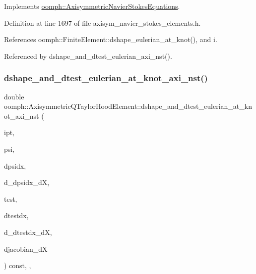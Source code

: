 Implements \hyperlink{classoomph_1_1AxisymmetricNavierStokesEquations_a76e090fdac4507d10eb9f81feb53a51b}{oomph\+::\+Axisymmetric\+Navier\+Stokes\+Equations}.



Definition at line 1697 of file axisym\+\_\+navier\+\_\+stokes\+\_\+elements.\+h.



References oomph\+::\+Finite\+Element\+::dshape\+\_\+eulerian\+\_\+at\+\_\+knot(), and i.



Referenced by dshape\+\_\+and\+\_\+dtest\+\_\+eulerian\+\_\+axi\+\_\+nst().

\mbox{\label{classoomph_1_1AxisymmetricQTaylorHoodElement_a77fe7f0caef36c951f99a923b94c2f7a}} 
\subsubsection{\texorpdfstring{dshape\+\_\+and\+\_\+dtest\+\_\+eulerian\+\_\+at\+\_\+knot\+\_\+axi\+\_\+nst()}{dshape\_and\_dtest\_eulerian\_at\_knot\_axi\_nst()}\hspace{0.1cm}{\footnotesize\ttfamily [2/2]}}
{\footnotesize\ttfamily double oomph\+::\+Axisymmetric\+Q\+Taylor\+Hood\+Element\+::dshape\+\_\+and\+\_\+dtest\+\_\+eulerian\+\_\+at\+\_\+knot\+\_\+axi\+\_\+nst (\begin{DoxyParamCaption}\item[{const unsigned \&}]{ipt,  }\item[{\hyperlink{classoomph_1_1Shape}{Shape} \&}]{psi,  }\item[{\hyperlink{classoomph_1_1DShape}{D\+Shape} \&}]{dpsidx,  }\item[{\hyperlink{classoomph_1_1RankFourTensor}{Rank\+Four\+Tensor}$<$ double $>$ \&}]{d\+\_\+dpsidx\+\_\+dX,  }\item[{\hyperlink{classoomph_1_1Shape}{Shape} \&}]{test,  }\item[{\hyperlink{classoomph_1_1DShape}{D\+Shape} \&}]{dtestdx,  }\item[{\hyperlink{classoomph_1_1RankFourTensor}{Rank\+Four\+Tensor}$<$ double $>$ \&}]{d\+\_\+dtestdx\+\_\+dX,  }\item[{\hyperlink{classoomph_1_1DenseMatrix}{Dense\+Matrix}$<$ double $>$ \&}]{djacobian\+\_\+dX }\end{DoxyParamCaption}) const\hspace{0.3cm}{\ttfamily [inline]}, {\ttfamily [protected]}, {\ttfamily [virtual]}}



